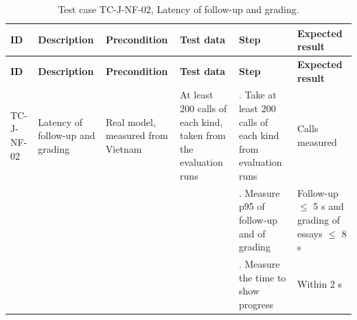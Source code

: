 {\footnotesize{}\renewcommand{\arraystretch}{1.1}
\begin{longtable}{|>{\raggedright\arraybackslash}p{}|>{\raggedright\arraybackslash}p{}|>{\raggedright\arraybackslash}p{}|>{\raggedright\arraybackslash}p{}|>{\raggedright\arraybackslash}p{}|>{\raggedright\arraybackslash}p{}|}
\caption{Test case TC-J-NF-02, Latency of follow-up and grading.} \\
\hline
\textbf{ID} & \textbf{Description} & \textbf{Precondition} & \textbf{Test data} & \textbf{Step} & \textbf{Expected result} \\ \hline
\endfirsthead
\hline
\textbf{ID} & \textbf{Description} & \textbf{Precondition} & \textbf{Test data} & \textbf{Step} & \textbf{Expected result} \\ \hline
\endhead
TC-J-NF-02 & Latency of follow-up and grading & Real model, measured from Vietnam & At least 200 calls of each kind, taken from the evaluation runs & 1. Take at least 200 calls of each kind from evaluation runs & Calls measured \\ \cline{5-6}
 &  &  &  & 2. Measure p95 of follow-up and of grading & Follow-up $\leq$ 5 s and grading of essays $\leq$ 8 s \\ \cline{5-6}
 &  &  &  & 3. Measure the time to show progress & Within 2 s \\ \hline
\end{longtable}
}

